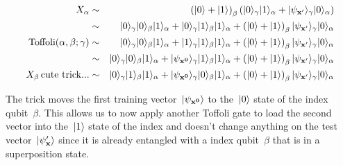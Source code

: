 \documentclass{article}
\DeclarePairedDelimiter\ket{\lvert}{\rangle}
\begin{document}
\begin{eqnarray*}
X_\alpha &\sim&  \left( \ket{0} + \ket{1} \right)_\beta \left( \ket{0}_\gamma  \ket{1}_\alpha + \ket{\psi_{\bf x^\prime}}_\gamma \ket{0}_\alpha \right) \\
 &\sim& \ket{0}_\gamma \ket{0}_\beta \ket{1}_\alpha + \ket{0}_\gamma \ket{1}_\beta \ket{1}_\alpha + \left( \ket{0} + \ket{1} \right)_\beta \ket{\psi_{\bf x^\prime}}_\gamma \ket{0}_\alpha  \\
\mbox{Toffoli}(\alpha, \beta ; \gamma) &\sim&  \ket{0}_\gamma \ket{0}_\beta \ket{1}_\alpha + \ket{1}_\gamma \ket{1}_\beta \ket{1}_\alpha + \left( \ket{0} + \ket{1} \right)_\beta \ket{\psi_{\bf x^\prime}}_\gamma \ket{0}_\alpha \\
&\sim&  \ket{0}_\gamma \ket{0}_\beta \ket{1}_\alpha + \ket{\psi_{\bf x^0}}_\gamma \ket{1}_\beta \ket{1}_\alpha + \left( \ket{0} + \ket{1} \right)_\beta \ket{\psi_{\bf x^\prime}}_\gamma \ket{0}_\alpha \\
X_\beta \, \mbox{cute trick...} &\sim&  \ket{0}_\gamma \ket{1}_\beta \ket{1}_\alpha + \ket{\psi_{\bf x^0}}_\gamma \ket{0}_\beta \ket{1}_\alpha + \left( \ket{0} + \ket{1} \right)_\beta \ket{\psi_{\bf x^\prime}}_\gamma \ket{0}_\alpha
\end{eqnarray*}



\noindent The trick moves the first training vector~$\ket{\psi_{\bf x^0}}$ to the~$\ket{0}$ state of the index qubit~$\beta$.  This allows us to now apply another Toffoli gate to load the second vector into the~$\ket{1}$ state of the index and doesn't change anything on the test vector~$\ket{\psi_{\bf x}^\prime}$ since it is already entangled with a index qubit~$\beta$ that is in a superposition state.
\end{document}

